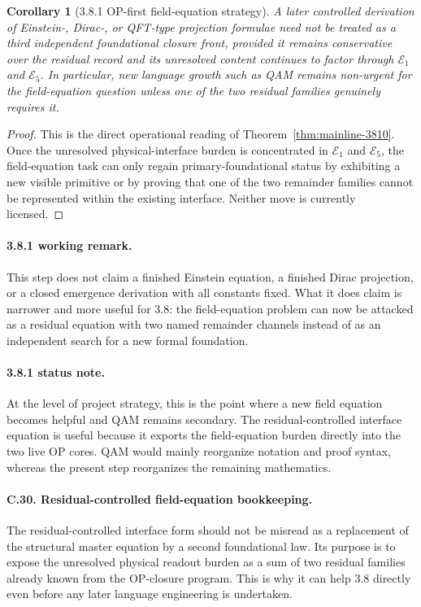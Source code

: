 \documentclass[12pt,a4paper]{article}
\newtheorem{corollary}[theorem]{Corollary}
\begin{document}
\begin{corollary}[3.8.1 OP-first field-equation strategy]
\label{cor:mainline-3810}
A later controlled derivation of Einstein-, Dirac-, or QFT-type projection formulae need not be treated as a third independent foundational closure front, provided it remains conservative over the residual record and its unresolved content continues to factor through \(\mathcal E_{1}\) and \(\mathcal E_{5}\). In particular, new language growth such as QAM remains non-urgent for the field-equation question unless one of the two residual families genuinely requires it.
\end{corollary}

\begin{proof}
This is the direct operational reading of Theorem~\ref{thm:mainline-3810}. Once the unresolved physical-interface burden is concentrated in \(\mathcal E_{1}\) and \(\mathcal E_{5}\), the field-equation task can only regain primary-foundational status by exhibiting a new visible primitive or by proving that one of the two remainder families cannot be represented within the existing interface. Neither move is currently licensed.
\end{proof}

\paragraph{3.8.1 working remark.}
This step does not claim a finished Einstein equation, a finished Dirac projection, or a closed emergence derivation with all constants fixed. What it does claim is narrower and more useful for 3.8: the field-equation problem can now be attacked as a residual equation with two named remainder channels instead of as an independent search for a new formal foundation.

\paragraph{3.8.1 status note.}
At the level of project strategy, this is the point where a new field equation becomes helpful and QAM remains secondary. The residual-controlled interface equation is useful because it exports the field-equation burden directly into the two live OP cores. QAM would mainly reorganize notation and proof syntax, whereas the present step reorganizes the remaining mathematics.

\paragraph{C.30. Residual-controlled field-equation bookkeeping.}
The residual-controlled interface form should not be misread as a replacement of the structural master equation by a second foundational law. Its purpose is to expose the unresolved physical readout burden as a sum of two residual families already known from the OP-closure program. This is why it can help 3.8 directly even before any later language engineering is undertaken.
\end{document}

